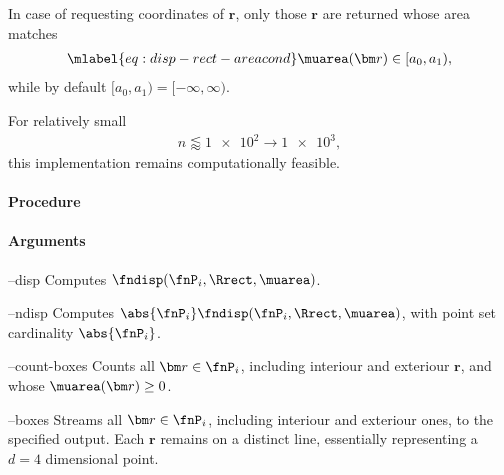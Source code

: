 In case of requesting coordinates of $\bm r$, only those $\bm r$ are returned whose area matches
\begin{align}\mlabel{eq:disp-rect-areacond}
  \muarea(\bm r) \in [a_0, a_1),
\end{align}
while by default $[a_0, a_1) = [-\infty, \infty)$.

For relatively small 
\begin{align*}
  n \lessapprox \num{1e2} \rightarrow \num{1e3},
\end{align*}
this implementation remains computationally feasible.

\paragraph{Procedure}

\begin{synopsis}
\end{synopsis}

\paragraph{Arguments}

\procarginseq{\ptseqsize}

\procargout

\begin{procarg}{--disp}
  Computes $\fndisp(\fnP_i, \Rrect, \muarea)$.
\end{procarg}

\begin{procarg}{--ndisp}
  Computes $\abs{\fnP_i} \fndisp(\fnP_i, \Rrect, \muarea)$, with point set cardinality $\abs{\fnP_i}$.
\end{procarg}

\begin{procarg}{--count-boxes}
  Counts all $\bm r \in \fnP_i$, including interiour and exteriour $\bm r$, and whose $\muarea(\bm r) \geq 0$.
\end{procarg}

\begin{procarg}{--boxes}
  Streams all $\bm r \in \fnP_i$, including interiour and exteriour ones, to the specified output. Each $\bm r$ remains on a distinct line, essentially representing a $d=4$ dimensional point.
\end{procarg}

